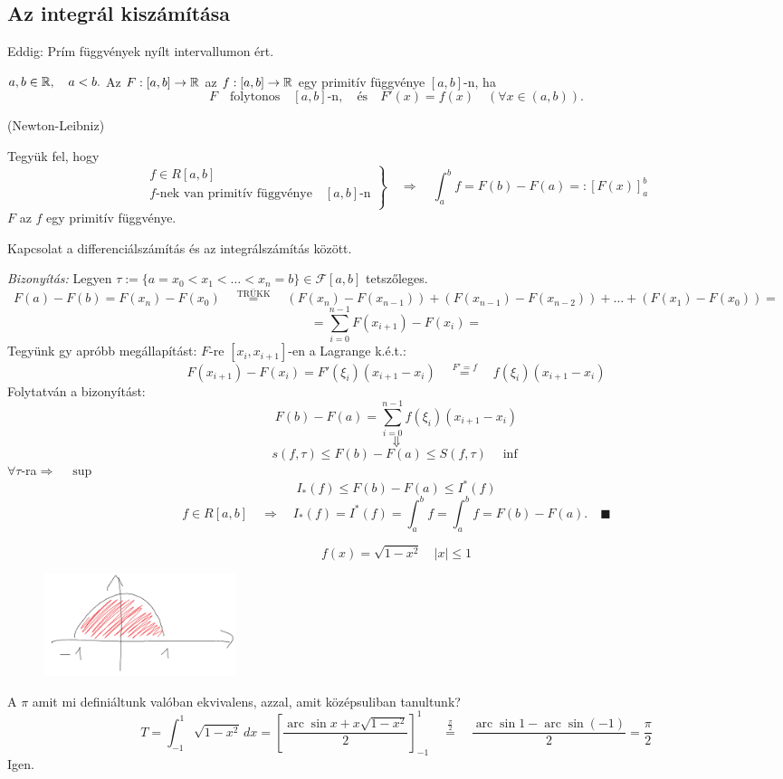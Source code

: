 \documentclass[a4paper,11.5pt]{article}
\DeclareMathOperator{\arc}{arc}
\begin{document}
	\subsection{Az integrál kiszámítása}
	Eddig: Prím függvények nyílt intervallumon ért.
	\begin{definition}
		$a,b\in\mathbb{R},\quad a<b.$ Az $F:[a,b]\to\mathbb{R}$ az $f:[a,b]\to\mathbb{R}$ egy primitív függvénye $[a,b]$-n, ha
		\[ F\quad \text{folytonos}\quad [a,b]\text{-n},\quad \text{és}\quad  F'(x)=f(x)\quad (\forall x\in(a,b)). \]
	\end{definition}
	\begin{theorem}
		(Newton-Leibniz)
		
		Tegyük fel, hogy
		\[ \left.\begin{gathered}
			f\in R[a,b]\\
			f\text{-nek van primitív függvénye}\quad [a,b]\text{-n}\\
		\end{gathered}\right\} \quad \Rightarrow\quad \int_a^bf=F(b)-F(a)=:[F(x)]_a^b  \]
		$F$ az $f$ egy primitív függvénye.
		\begin{note}
			Kapcsolat a differenciálszámítás és az integrálszámítás között.
		\end{note}
		\textit{Bizonyítás:} Legyen $\tau:=\{ a=x_0<x_1<\ldots<x_n=b \}\in\mathcal{F}[a,b]$ tetszőleges.
		\[ F(a)-F(b)=F(x_n)-F(x_0)\quad \overset{\text{TRÜKK}}{=}\quad (F(x_n)-F(x_{n-1}))+(F(x_{n-1})-F(x_{n-2}))+\ldots+(F(x_1)-F(x_0))=\]
		\[=\sum_{i=0}^{n-1}F(x_{i+1})-F(x_i)= \]
		Tegyünk gy apróbb megállapítást: $F$-re $[x_i,x_{i+1}]$-en a Lagrange k.é.t.: 
		\[ F(x_{i+1})-F(x_i)=F'(\xi_i)(x_{i+1}-x_i)\quad \overset{F'=f}{=}\quad f(\xi_i)(x_{i+1}-x_i) \]
		Folytatván a bizonyítást:
		\[ F(b)-F(a)=\sum_{i=0}^{n-1}f(\xi_i)(x_{i+1}-x_i) \]
		\[ \Downarrow \]
		\[ s(f,\tau)\leq F(b)-F(a)\leq S(f,\tau)\quad \inf\]
		$\forall \tau$-ra\quad $\Rightarrow\quad \sup$
		\[ I_*(f)\leq F(b)-F(a)\leq I^*(f) \]
		\[ f\in R[a,b]\quad \Rightarrow\quad I_*(f)=I^*(f)=\int_a^bf=\int_a^bf=F(b)-F(a).\quad \blacksquare \]
	\end{theorem}
	\begin{example}
		\[ f(x)=\sqrt{1-x^2}\quad |x|\leq 1 \]
		
		\begin{figure}[H]
			\centering
			\includegraphics[height=3cm]{kepek/third.png}
			\caption{}\label{}
		\end{figure}
	\end{example}	
	A $\pi$ amit mi definiáltunk valóban ekvivalens, azzal, amit középsuliban tanultunk?
	\[ T=\int_{-1}^{1}\sqrt{1-x^2}\,dx=\left[\frac{\arc\sin x+x\sqrt{1-x^2}}{2}\right]_{-1}^1\quad \overset{\frac{\pi}{2}}{=}\quad \frac{\arc\sin1-\arc\sin(-1)}{2}=\frac{\pi}{2} \]
	Igen.
\end{document}
